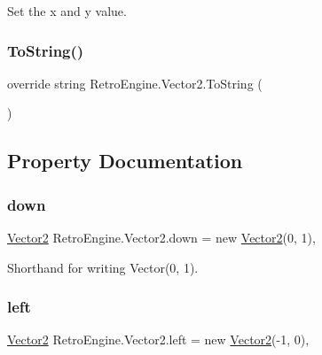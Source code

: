 Set the x and y value. 

\mbox{\label{struct_retro_engine_1_1_vector2_a423ca0b3c7e5d721f7fa18c2d387f415}} 
\subsubsection{\texorpdfstring{ToString()}{ToString()}}
{\footnotesize\ttfamily override string Retro\+Engine.\+Vector2.\+To\+String (\begin{DoxyParamCaption}{ }\end{DoxyParamCaption})}



\subsection{Property Documentation}
\mbox{\label{struct_retro_engine_1_1_vector2_a7509cafc4d844d1d23a77757ab8f965e}} 
\subsubsection{\texorpdfstring{down}{down}}
{\footnotesize\ttfamily \mbox{\hyperlink{struct_retro_engine_1_1_vector2}{Vector2}} Retro\+Engine.\+Vector2.\+down = new \mbox{\hyperlink{struct_retro_engine_1_1_vector2}{Vector2}}(0, 1)\hspace{0.3cm}{\ttfamily [static]}, {\ttfamily [get]}}



Shorthand for writing Vector(0, 1). 

\mbox{\label{struct_retro_engine_1_1_vector2_ac708d17f8f7cf45408d1228d29f35d97}} 
\subsubsection{\texorpdfstring{left}{left}}
{\footnotesize\ttfamily \mbox{\hyperlink{struct_retro_engine_1_1_vector2}{Vector2}} Retro\+Engine.\+Vector2.\+left = new \mbox{\hyperlink{struct_retro_engine_1_1_vector2}{Vector2}}(-\/1, 0)\hspace{0.3cm}{\ttfamily [static]}, {\ttfamily [get]}}



